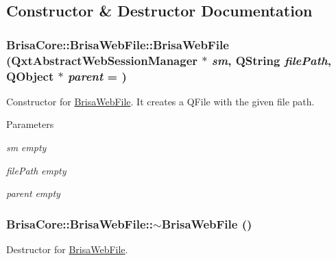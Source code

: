 \subsection{Constructor \& Destructor Documentation}
\hypertarget{classBrisaCore_1_1BrisaWebFile_af33e8bc81a9cd5e6e12563ec715446d2}{
\subsubsection[{BrisaWebFile}]{\setlength{\rightskip}{0pt plus 5cm}BrisaCore::BrisaWebFile::BrisaWebFile (QxtAbstractWebSessionManager $\ast$ {\em sm}, \/  QString {\em filePath}, \/  QObject $\ast$ {\em parent} = {})}}
\label{classBrisaCore_1_1BrisaWebFile_af33e8bc81a9cd5e6e12563ec715446d2}


Constructor for \hyperlink{classBrisaCore_1_1BrisaWebFile}{BrisaWebFile}. It creates a QFile with the given file path.


\begin{DoxyParams}{Parameters}
\item[{\em sm}]{\itshape empty\/} \item[{\em filePath}]{\itshape empty\/} \item[{\em parent}]{\itshape empty\/} \end{DoxyParams}
\hypertarget{classBrisaCore_1_1BrisaWebFile_a6b9d26d429eb59e56d2bedffd3fded05}{
\subsubsection[{$\sim$BrisaWebFile}]{\setlength{\rightskip}{0pt plus 5cm}BrisaCore::BrisaWebFile::$\sim$BrisaWebFile ()}}
\label{classBrisaCore_1_1BrisaWebFile_a6b9d26d429eb59e56d2bedffd3fded05}


Destructor for \hyperlink{classBrisaCore_1_1BrisaWebFile}{BrisaWebFile}. 

